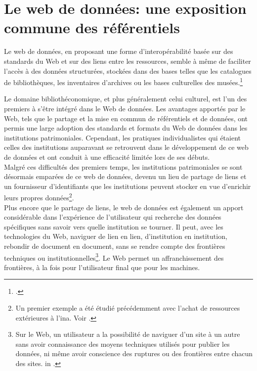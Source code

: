 \chapter{\label{II-A}Le web de données: une exposition commune des référentiels}

\begin{citationLongue}
	Le web de données, en proposant une forme d'interopérabilité basée sur des standards du Web et sur des liens entre les ressources, semble à même de faciliter l'accès à des données structurées, stockées dans des bases telles que les catalogues de bibliothèques, les inventaires d'archives ou les bases culturelles des musées.\footcite[p.45]{dalbin_approches_2011}
\end{citationLongue}
\medskip
Le domaine bibliothéconomique, et plus généralement celui culturel, est l'un des premiers à s'être intégré dans le Web de données. Les avantages apportés par le Web, tels que le partage et la mise en commun de référentiels et de données, ont permis une large adoption des standards et formats du Web de données dans les institutions patrimoniales. Cependant, les pratiques individualistes qui étaient celles des institutions auparavant se retrouvent dans le développement de ce web de données et ont conduit à une efficacité limitée lors de ses débuts.\\

Malgré ces difficultés des premiers temps, les institutions patrimoniales se sont désormais emparées de ce web de données, devenu un lieu de partage de liens et un fournisseur d'identifiants que les institutions peuvent stocker en vue d'enrichir leurs propres données\footnote{Un premier exemple a été étudié précédemment avec l'achat de ressources extérieures à l'\ac{ina}. Voir .}.\\

Plus encore que le partage de liens, le web de données est également un apport considérable dans l'expérience de l'utilisateur qui recherche des données spécifiques sans savoir vers quelle institution se tourner. Il peut, avec les technologies du Web, naviguer de lien en lien, d'institution en institution, rebondir de document en document, sans se rendre compte des frontières techniques ou institutionnelles\footnote{\og Sur le Web, un utilisateur a la possibilité de naviguer d'un site à un autre sans avoir connaissance des moyens techniques utilisés pour publier les données, ni même avoir conscience des ruptures ou des frontières entre chacun des sites. \fg{} in \cite[p.45]{dalbin_approches_2011}.}. Le Web permet un affranchissement des frontières, à la fois pour l'utilisateur final que pour les machines.\\

